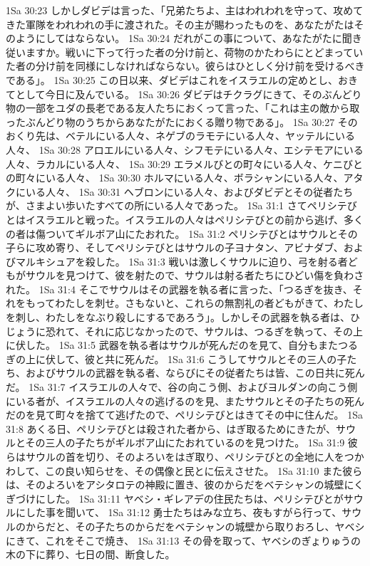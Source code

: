1Sa 30:23  しかしダビデは言った、「兄弟たちよ、主はわれわれを守って、攻めてきた軍隊をわれわれの手に渡された。その主が賜わったものを、あなたがたはそのようにしてはならない。
1Sa 30:24  だれがこの事について、あなたがたに聞き従いますか。戦いに下って行った者の分け前と、荷物のかたわらにとどまっていた者の分け前を同様にしなければならない。彼らはひとしく分け前を受けるべきである」。
1Sa 30:25  この日以来、ダビデはこれをイスラエルの定めとし、おきてとして今日に及んでいる。
1Sa 30:26  ダビデはチクラグにきて、そのぶんどり物の一部をユダの長老である友人たちにおくって言った、「これは主の敵から取ったぶんどり物のうちからあなたがたにおくる贈り物である」。
1Sa 30:27  そのおくり先は、ベテルにいる人々、ネゲブのラモテにいる人々、ヤッテルにいる人々、
1Sa 30:28  アロエルにいる人々、シフモテにいる人々、エシテモアにいる人々、ラカルにいる人々、
1Sa 30:29  エラメルびとの町々にいる人々、ケニびとの町々にいる人々、
1Sa 30:30  ホルマにいる人々、ボラシャンにいる人々、アタクにいる人々、
1Sa 30:31  ヘブロンにいる人々、およびダビデとその従者たちが、さまよい歩いたすべての所にいる人々であった。
1Sa 31:1  さてペリシテびとはイスラエルと戦った。イスラエルの人々はペリシテびとの前から逃げ、多くの者は傷ついてギルボア山にたおれた。
1Sa 31:2  ペリシテびとはサウルとその子らに攻め寄り、そしてペリシテびとはサウルの子ヨナタン、アビナダブ、およびマルキシュアを殺した。
1Sa 31:3  戦いは激しくサウルに迫り、弓を射る者どもがサウルを見つけて、彼を射たので、サウルは射る者たちにひどい傷を負わされた。
1Sa 31:4  そこでサウルはその武器を執る者に言った、「つるぎを抜き、それをもってわたしを刺せ。さもないと、これらの無割礼の者どもがきて、わたしを刺し、わたしをなぶり殺しにするであろう」。しかしその武器を執る者は、ひじょうに恐れて、それに応じなかったので、サウルは、つるぎを執って、その上に伏した。
1Sa 31:5  武器を執る者はサウルが死んだのを見て、自分もまたつるぎの上に伏して、彼と共に死んだ。
1Sa 31:6  こうしてサウルとその三人の子たち、およびサウルの武器を執る者、ならびにその従者たちは皆、この日共に死んだ。
1Sa 31:7  イスラエルの人々で、谷の向こう側、およびヨルダンの向こう側にいる者が、イスラエルの人々の逃げるのを見、またサウルとその子たちの死んだのを見て町々を捨てて逃げたので、ペリシテびとはきてその中に住んだ。
1Sa 31:8  あくる日、ペリシテびとは殺された者から、はぎ取るためにきたが、サウルとその三人の子たちがギルボア山にたおれているのを見つけた。
1Sa 31:9  彼らはサウルの首を切り、そのよろいをはぎ取り、ペリシテびとの全地に人をつかわして、この良い知らせを、その偶像と民とに伝えさせた。
1Sa 31:10  また彼らは、そのよろいをアシタロテの神殿に置き、彼のからだをベテシャンの城壁にくぎづけにした。
1Sa 31:11  ヤベシ・ギレアデの住民たちは、ペリシテびとがサウルにした事を聞いて、
1Sa 31:12  勇士たちはみな立ち、夜もすがら行って、サウルのからだと、その子たちのからだをベテシャンの城壁から取りおろし、ヤベシにきて、これをそこで焼き、
1Sa 31:13  その骨を取って、ヤベシのぎょりゅうの木の下に葬り、七日の間、断食した。


